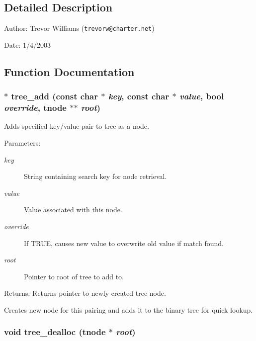 \subsection{Detailed Description}
\begin{Desc}
\item[Author:]Trevor Williams ({\tt trevorw@charter.net}) \end{Desc}
\begin{Desc}
\item[Date:]1/4/2003\end{Desc}


\subsection{Function Documentation}
\subsubsection{$\ast$ tree\_\-add (const char $\ast$ {\em key}, const char $\ast$ {\em value}, {\bf bool} {\em override}, {\bf tnode} $\ast$$\ast$ {\em root})}\label{tree_8c_a0}


Adds specified key/value pair to tree as a node.

\begin{Desc}
\item[Parameters:]
\begin{description}
\item[{\em key}]String containing search key for node retrieval. \item[{\em value}]Value associated with this node. \item[{\em override}]If TRUE, causes new value to overwrite old value if match found. \item[{\em root}]Pointer to root of tree to add to.\end{description}
\end{Desc}
\begin{Desc}
\item[Returns:]Returns pointer to newly created tree node.\end{Desc}
Creates new node for this pairing and adds it to the binary tree for quick lookup. 
\subsubsection{\setlength{\rightskip}{0pt plus 5cm}void tree\_\-dealloc ({\bf tnode} $\ast$ {\em root})}\label{tree_8c_a3}


